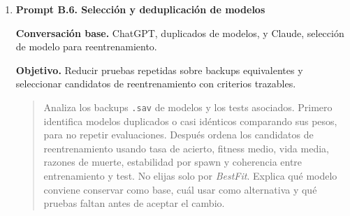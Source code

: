 {\begin{enumerate}[leftmargin=*,itemsep=0.2\baselineskip,topsep=2pt,parsep=0pt,partopsep=0pt]
  \textbf{Conversación base.} ChatGPT, modificación de triggers y refresco de spawns.

  \textbf{Objetivo.} Evitar que el rendimiento de test se midiera sobre los mismos recorridos que condicionaban el entrenamiento.

  \promptDepurado
  \begin{quote}
  \small
  Revisa la lógica de spawns y triggers de dirección. Quiero separar entrenamiento y test: en entrenamiento deben usarse solo los puntos y trayectorias habilitados para aprender, mientras que el test debe evaluar un conjunto independiente y completo. Indica qué variables deben pertenecer al trigger, cuáles al gestor evolutivo y en qué momento conviene refrescar la lista de spawns para evitar mezclas entre modos. Propón comprobaciones en CSV para verificar que cada ejecución usa el conjunto correcto.
  \end{quote}

  \textbf{Respuesta aprovechada.} Se aprovechó la necesidad de separar \texttt{TrainMode}, listas válidas por modo, refresco de spawns y trayectorias permitidas.

  \textbf{Comprobación realizada.} Se revisaron \texttt{BP\_Trigger}, \texttt{RefreshSpawnPoints}, los resúmenes de test y la distribución de observaciones por los 54 spawns.

  \textbf{Uso final en el proyecto.} La memoria presenta la separación train/test como decisión metodológica clave y advierte que el test no debe interpretarse como nueva fase de aprendizaje.

  \item \textbf{Prompt B.6. Selección y deduplicación de modelos}

  \textbf{Conversación base.} ChatGPT, duplicados de modelos, y Claude, selección de modelo para reentrenamiento.

  \textbf{Objetivo.} Reducir pruebas repetidas sobre backups equivalentes y seleccionar candidatos de reentrenamiento con criterios trazables.

  \promptDepurado
  \begin{quote}
  \small
  Analiza los backups \texttt{.sav} de modelos y los tests asociados. Primero identifica modelos duplicados o casi idénticos comparando sus pesos, para no repetir evaluaciones. Después ordena los candidatos de reentrenamiento usando tasa de acierto, fitness medio, vida media, razones de muerte, estabilidad por spawn y coherencia entre entrenamiento y test. No elijas solo por \textit{BestFit}. Explica qué modelo conviene conservar como base, cuál usar como alternativa y qué pruebas faltan antes de aceptar el cambio.
  \end{quote}


\end{enumerate}}
